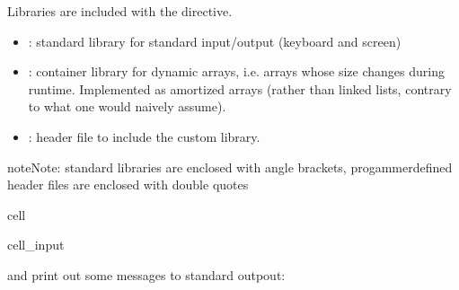 \documentclass[a4paper,10pt,english]{jupyterBook}
\begin{document}
\sphinxAtStartPar
Libraries are included with the  directive.
\begin{itemize}
\item {} 
\sphinxAtStartPar
{}: standard library for standard input/output (keyboard and screen)

\item {} 
\sphinxAtStartPar
{}: container library for dynamic arrays, i.e. arrays whose size changes during run\sphinxhyphen{}time. Implemented as amortized arrays (rather than linked lists, contrary to what one would naively assume).

\item {} 
\sphinxAtStartPar
{}: header file to include the custom  library.

\end{itemize}

\begin{sphinxadmonition}{note}{Note:}
\sphinxAtStartPar
standard libraries are enclosed with angle brackets, progammer\sphinxhyphen{}defined header files are enclosed with double quotes
\end{sphinxadmonition}

\begin{sphinxuseclass}{cell}\begin{sphinxVerbatimInput}

\begin{sphinxuseclass}{cell_input}
\begin{sphinxVerbatim}[commandchars=\\\{\}]
\end{sphinxVerbatim}

\end{sphinxuseclass}\end{sphinxVerbatimInput}

\end{sphinxuseclass}
\sphinxAtStartPar
and print out some messages to standard outpout:
\end{document}
